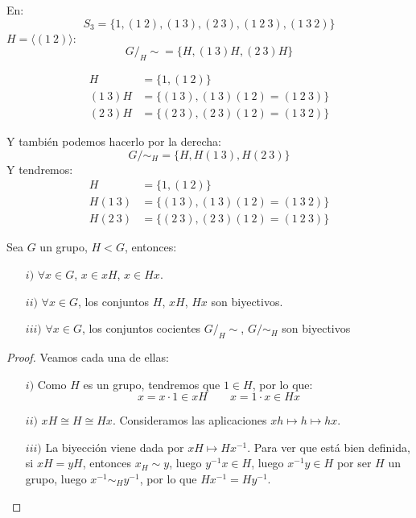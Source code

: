 \begin{ejemplo}
    En:
    \begin{equation*}
        S_3 = \{1, (1\ 2), (1\ 3), (2\ 3), (1\ 2\ 3), (1\ 3\ 2)\}
    \end{equation*}
    $H = \langle (1\ 2) \rangle $:
    \begin{equation*}
        G/_H\sim = \{H, (1\ 3)H, (2\ 3)H\}
    \end{equation*}

    \begin{align*}
        H &= \{1, (1\ 2)\} \\
        (1\ 3)H &= \{(1\ 3), (1\ 3)(1\ 2) = (1\ 2\ 3)\} \\
        (2\ 3)H &= \{(2\ 3), (2\ 3)(1\ 2) = (1\ 3\ 2)\}
    \end{align*}

    Y también podemos hacerlo por la derecha:
    \begin{equation*}
        G/\sim_H = \{H, H(1\ 3), H(2\ 3)\}
    \end{equation*}
    Y tendremos:
    \begin{align*}
        H &= \{1, (1\ 2)\} \\
        H(1\ 3) &= \{(1\ 3), (1\ 3)(1\ 2) = (1\ 3\ 2)\} \\
        H(2\ 3) &= \{(2\ 3), (2\ 3)(1\ 2) = (1\ 2\ 3)\}
    \end{align*}

\end{ejemplo}

\begin{prop}
    Sea $G$ un grupo, $H < G$, entonces:
    \begin{enumerate}
        \item[$i)$] $\forall x\in G$, $x\in xH$, $x\in Hx$.
        \item[$ii)$] $\forall x\in G$, los conjuntos $H$, $xH$, $Hx$ son biyectivos.
        \item[$iii)$] $\forall x\in G$, los conjuntos cocientes $G/_H\sim$, $G/\sim_H$ son biyectivos
    \end{enumerate}
    \begin{proof} Veamos cada una de ellas:
        \begin{enumerate}
            \item[$i)$] Como $H$ es un grupo, tendremos que $1\in H$, por lo que:
                \begin{equation*}
                    x = x\cdot 1 \in xH \qquad x = 1\cdot x \in Hx
                \end{equation*}
            \item[$ii)$] $xH\cong H \cong Hx$. Consideramos las aplicaciones $xh \longmapsto h \longmapsto hx$.
            \item[$iii)$] La biyección viene dada por $xH\longmapsto Hx^{-1}$. Para ver que está bien definida, si $xH = yH$, entonces $x_H\sim y$, luego $y^{-1}x \in H$, luego $x^{-1}y \in H$ por ser $H$ un grupo, luego $x^{-1}\sim_Hy^{-1}$, por lo que $Hx^{-1}= Hy^{-1}$.
        \end{enumerate}
    \end{proof}
\end{prop}

